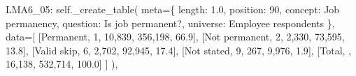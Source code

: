 \documentclass[
  11pt,
  a4paper,
]{article}
\newenvironment{Shaded}{\begin{snugshade}}{\end{snugshade}}
\newcommand{\NormalTok}[1]{\textcolor[rgb]{0.00,0.23,0.31}{#1}}
\newcommand{\OperatorTok}[1]{\textcolor[rgb]{0.37,0.37,0.37}{#1}}
\newcommand{\StringTok}[1]{\textcolor[rgb]{0.13,0.47,0.30}{#1}}
\newcommand{\VariableTok}[1]{\textcolor[rgb]{0.07,0.07,0.07}{#1}}
\begin{document}
\begin{Shaded}
\begin{Highlighting}[]
            \StringTok{\textquotesingle{}LMA6\_05\textquotesingle{}}\NormalTok{: }\VariableTok{self}\NormalTok{.\_create\_table(}
\NormalTok{                meta}\OperatorTok{=}\NormalTok{\{}
                    \StringTok{\textquotesingle{}length\textquotesingle{}}\NormalTok{: }\StringTok{\textquotesingle{}1.0\textquotesingle{}}\NormalTok{, }\StringTok{\textquotesingle{}position\textquotesingle{}}\NormalTok{: }\StringTok{\textquotesingle{}90\textquotesingle{}}\NormalTok{,}
                    \StringTok{\textquotesingle{}concept\textquotesingle{}}\NormalTok{: }\StringTok{\textquotesingle{}Job permanency\textquotesingle{}}\NormalTok{,}
                    \StringTok{\textquotesingle{}question\textquotesingle{}}\NormalTok{: }\StringTok{\textquotesingle{}Is job permanent?\textquotesingle{}}\NormalTok{,}
                    \StringTok{\textquotesingle{}universe\textquotesingle{}}\NormalTok{: }\StringTok{\textquotesingle{}Employee respondents\textquotesingle{}}
\NormalTok{                \},}
\NormalTok{                data}\OperatorTok{=}\NormalTok{[}
\NormalTok{                    [}\StringTok{\textquotesingle{}Permanent\textquotesingle{}}\NormalTok{, }\StringTok{\textquotesingle{}1\textquotesingle{}}\NormalTok{, }\StringTok{\textquotesingle{}10,839\textquotesingle{}}\NormalTok{, }\StringTok{\textquotesingle{}356,198\textquotesingle{}}\NormalTok{, }\StringTok{\textquotesingle{}66.9\textquotesingle{}}\NormalTok{],}
\NormalTok{                    [}\StringTok{\textquotesingle{}Not permanent\textquotesingle{}}\NormalTok{, }\StringTok{\textquotesingle{}2\textquotesingle{}}\NormalTok{, }\StringTok{\textquotesingle{}2,330\textquotesingle{}}\NormalTok{, }\StringTok{\textquotesingle{}73,595\textquotesingle{}}\NormalTok{, }\StringTok{\textquotesingle{}13.8\textquotesingle{}}\NormalTok{],}
\NormalTok{                    [}\StringTok{\textquotesingle{}Valid skip\textquotesingle{}}\NormalTok{, }\StringTok{\textquotesingle{}6\textquotesingle{}}\NormalTok{, }\StringTok{\textquotesingle{}2,702\textquotesingle{}}\NormalTok{, }\StringTok{\textquotesingle{}92,945\textquotesingle{}}\NormalTok{, }\StringTok{\textquotesingle{}17.4\textquotesingle{}}\NormalTok{],}
\NormalTok{                    [}\StringTok{\textquotesingle{}Not stated\textquotesingle{}}\NormalTok{, }\StringTok{\textquotesingle{}9\textquotesingle{}}\NormalTok{, }\StringTok{\textquotesingle{}267\textquotesingle{}}\NormalTok{, }\StringTok{\textquotesingle{}9,976\textquotesingle{}}\NormalTok{, }\StringTok{\textquotesingle{}1.9\textquotesingle{}}\NormalTok{],}
\NormalTok{                    [}\StringTok{\textquotesingle{}Total\textquotesingle{}}\NormalTok{, }\StringTok{\textquotesingle{}\textquotesingle{}}\NormalTok{, }\StringTok{\textquotesingle{}16,138\textquotesingle{}}\NormalTok{, }\StringTok{\textquotesingle{}532,714\textquotesingle{}}\NormalTok{, }\StringTok{\textquotesingle{}100.0\textquotesingle{}}\NormalTok{]}
\NormalTok{                ]}
\NormalTok{            ),}
            

\end{Highlighting}
\end{Shaded}
\end{document}
